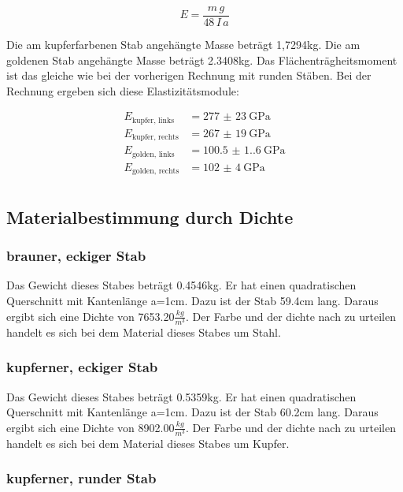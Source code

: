 \begin{displaymath}
    E = \frac{m\, g}{48\, I\, a}
\end{displaymath}

\noindent Die am kupferfarbenen Stab angehängte Masse beträgt 1,7294kg. Die am goldenen Stab angehängte Masse beträgt 2.3408kg. Das Flächenträgheitsmoment ist das gleiche wie bei der vorherigen Rechnung mit runden Stäben. Bei der Rechnung ergeben sich diese Elastizitätsmodule: 

\begin{align*}
    E_\text{kupfer, links} &=  \SI[separate-uncertainty=true]{277(23)}{\giga\pascal}   \\
    E_\text{kupfer, rechts} &= \SI[separate-uncertainty=true]{267(19)}{\giga\pascal}   \\
    E_\text{golden, links} &=  \SI[separate-uncertainty=true]{100.5(1.6)}{\giga\pascal}\\
    E_\text{golden, rechts} &= \SI[separate-uncertainty=true]{102(4)}{\giga\pascal}    \\
\end{align*}

\subsection{Materialbestimmung durch Dichte}

\subsubsection{brauner, eckiger Stab}

Das Gewicht dieses Stabes beträgt 0.4546kg. Er hat einen quadratischen Querschnitt mit Kantenlänge a=1cm. Dazu ist der Stab 59.4cm lang. Daraus ergibt sich eine Dichte von 7653.20$\frac{kg}{m^3}$.
Der Farbe und der dichte nach zu urteilen handelt es sich bei dem Material dieses Stabes um Stahl.

\subsubsection{kupferner, eckiger Stab}

Das Gewicht dieses Stabes beträgt 0.5359kg. Er hat einen quadratischen Querschnitt mit Kantenlänge a=1cm. Dazu ist der Stab 60.2cm lang. Daraus ergibt sich eine Dichte von 8902.00$\frac{kg}{m^3}$.
Der Farbe und der dichte nach zu urteilen handelt es sich bei dem Material dieses Stabes um Kupfer.

\subsubsection{kupferner, runder Stab}

